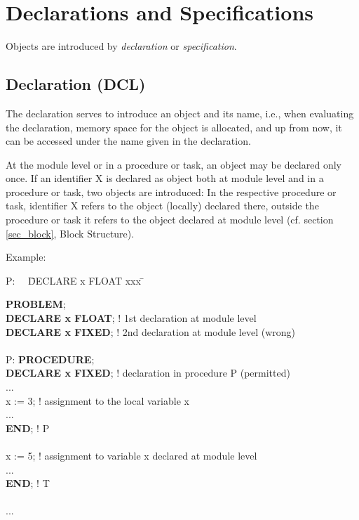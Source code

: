 \section{Declarations and Specifications} %
\label{sec_dcl_and_spc}

Objects are introduced by {\it declaration} or {\it specification}.

\subsection{Declaration (DCL)}  %

The declaration serves to introduce an object and its name, i.e., when
evaluating the declaration, memory space for the object is allocated, and
up from now, it can be accessed under the name given in the
declaration.

At the module level or in a procedure or task, an object may be declared
only once. If an identifier X is declared as object both at module level
and in a procedure or task, two objects are introduced: In the
respective procedure or task, identifier X refers to the object
(locally) declared there, outside the procedure or task it refers to the
object declared at module level (cf. section \ref{sec_block}, Block Structure).

Example:

\begin{tabbing}
P:~~ \= DECLARE x FLOAT xxx \=   \kill

{\bf PROBLEM}; \>            \> \\
   \> {\bf DECLARE x FLOAT}; \> ! 1st declaration at module level\\
   \> {\bf DECLARE x FIXED}; \> ! 2nd declaration at module level (wrong)\\
   \>                        \> \\
P: \> {\bf PROCEDURE};       \> \\
   \> {\bf DECLARE x FIXED}; \> ! declaration in procedure P (permitted)\\
   \> ...                    \> \\
   \> x := 3;                \> ! assignment to the local variable x\\
   \> ...                    \> \\
   \> {\bf END};             \> ! P \\
   \>                        \> \\
   \> x := 5;                \> ! assignment to variable x declared at module level\\
   \> ...                    \> \\
   \> {\bf END};             \> ! T \\
   \>                        \> \\
... \>                       \>
\end{tabbing}


